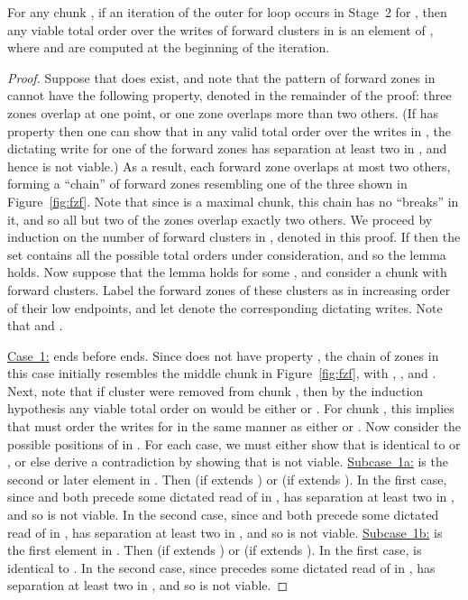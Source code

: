 \begin{lemma}
\label{lemma:fzf-stage2-a}
For any chunk , if an iteration of the outer for loop occurs in Stage~2 for , then
any viable total order  over the writes of forward clusters in  is an element
of , where  and  are computed at the beginning of the iteration.
\begin{proof}
Suppose that  does exist, and note that the pattern of forward zones in 
cannot have the following property, denoted  in the remainder of the proof:
three zones overlap at one point, or one zone overlaps more than two others.
(If  has property  then one can show that in any valid total order  over the writes in ,
 the dictating write for one of the forward zones has separation at least two in , and hence  is not viable.)
As a result, each forward zone overlaps at most two others, forming a ``chain''
of forward zones resembling one of the three shown in Figure~\ref{fig:fzf}.
Note that since  is a maximal chunk, this chain has no ``breaks'' in it,
and so all but two of the zones overlap exactly two others.
We proceed by induction on the number of forward clusters in , denoted  in this proof.
If  then the set  contains all the possible total orders under consideration,
and so the lemma holds.
Now suppose that the lemma holds for some , and consider a chunk with  forward clusters.
Label the forward zones of these clusters as  in increasing order of their low endpoints,
and let  denote the corresponding dictating writes.
Note that  and .

\noindent\underline{Case~1:}  ends before  ends.
Since  does not have property , the chain of zones in this case initially resembles the
middle chunk in Figure~\ref{fig:fzf}, with , , and .
Next, note that if cluster  were removed from chunk , then by the induction hypothesis
any viable total order on  would be either 
or .
For chunk , this implies that  must order the writes for  in the same manner as either  or .
Now consider the possible positions of  in .
For each case, we must either show that  is identical to  or , or else derive a contradiction
by showing that  is not viable.
\newline\noindent\underline{Subcase~1a:}  is the second or later element in .
Then  (if  extends ) or  (if  extends ).
In the first case, since  and  both precede some dictated read of  in ,
 has separation at least two in , and so  is not viable.
In the second case, since  and  both precede some dictated read of  in ,
 has separation at least two in , and so  is not viable.
\newline\noindent\underline{Subcase~1b:}  is the first element in .
Then  (if  extends ) or  (if  extends ).
In the first case,  is identical to .
In the second case, since  precedes some dictated read of  in ,
 has separation at least two in , and so  is not viable.


\end{proof}
\end{lemma}
